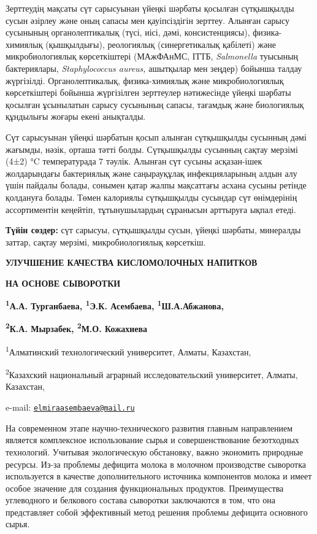 {{Зерттеудің мақсаты сүт сарысуынан үйеңкі шәрбаты қосылған сүтқышқылды
сусын әзірлеу және оның сапасы мен қауіпсіздігін зерттеу. Алынған сарысу
сусынының органолептикалық (түсі, иісі, дәмі, консистенциясы),
физика-химиялық (қышқылдығы), реологиялық (синергетикалық қабілеті) және
микробиологиялық көрсеткіштері (МАжФАнМС, ІТТБ, \emph{Salmonella}
туысының бактериялары, \emph{Staphylococcus aureus,} ашытқылар мен
зеңдер) бойынша талдау жүргізілді. Органолептикалық, физика-химиялық
және микробиологиялық көрсеткіштері бойынша жүргізілген зерттеулер
нәтижесінде үйеңкі шәрбаты қосылған ұсынылатын сарысу сусынының сапасы,
тағамдық және биологиялық құндылығы жоғары екені анықталды.

Сүт сарысуынан үйеңкі шәрбатын қосып алынған сүтқышқылды сусынның дәмі
жағымды, нәзік, орташа тәтті болды. Сүтқышқылды сусынның сақтау мерзімі
(4±2) °C температурада 7 тәулік. Алынған сүт сусыны асқазан-ішек
жолдарындағы бактериялық және саңырауқұлақ инфекцияларының алдын алу
үшін пайдалы болады, сонымен қатар жалпы мақсаттағы асхана сусыны
ретінде қолдануға болады. Төмен калориялы сүтқышқылды сусындар сүт
өнімдерінің ассортиментін кеңейтіп, тұтынушылардың сұранысын арттыруға
ықпал етеді.

{\bfseries Түйін сөздер:} сүт сарысуы, сүтқышқылды сусын, үйеңкі шәрбаты,
минералды заттар, сақтау мерзімі, микробиологиялық көрсеткіш.

{\bfseries УЛУЧШЕНИЕ КАЧЕСТВА КИСЛОМОЛОЧНЫХ НАПИТКОВ}

{\bfseries НА ОСНОВЕ СЫВОРОТКИ}

{\bfseries \textsuperscript{1}А.А. Турганбаева, \textsuperscript{1}Э.К.
Асембаева\textsuperscript{\envelope }, \textsuperscript{1}Ш.А.Абжанова,}

{\bfseries \textsuperscript{2}К.А. Мырзабек, \textsuperscript{2}М.О.
Кожахиева}

\textsuperscript{1}Алматинский технологический университет, Алматы,
Казахстан,

\textsuperscript{2}Казахский национальный аграрный исследовательский
университет, Алматы, Казахстан,

e-mail:
\href{mailto:elmiraasembaeva@mail.ru}{\nolinkurl{elmiraasembaeva@mail.ru}}

На современном этапе научно-технического развития главным направлением
является комплексное использование сырья и совершенствование безотходных
технологий. Учитывая экологическую обстановку, важно экономить природные
ресурсы. Из-за проблемы дефицита молока в молочном производстве
сыворотка используется в качестве дополнительного источника компонентов
молока и имеет особое значение для создания функциональных продуктов.
Преимущества углеводного и белкового состава сыворотки заключаются в
том, что она представляет собой эффективный метод решения проблемы
дефицита основного сырья.

}}
